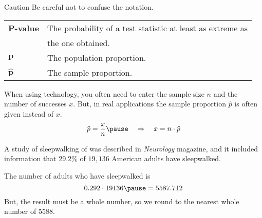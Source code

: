 \documentclass{beamer}
\begin{document}
\begin{frame}
\begin{block}{Caution}
Be careful not to confuse the notation.
\begin{center}
\begin{tabular}{ll}
\textbf{$\boldsymbol{P}$-value} & The probability of a test statistic at least as extreme as \\
&the one obtained.\\
$\boldsymbol{p}$ & The population proportion.\\
$\boldsymbol{\hat{p}}$ & The sample proportion.
\end{tabular}
\end{center}
\end{block}
\end{frame}

\begin{frame}
\begin{note}
When using technology, you often need to enter the sample size $n$ and the number of successes $x$. But, in real applications the sample proportion $\hat{p}$ is often given instead of $x$.\pause
\begin{equation*}
\hat{p} = \dfrac{x}{n} \pause
\quad\Rightarrow\quad
x = n\cdot\hat{p}
\end{equation*}
\end{note}\pause

\begin{example}
A study of sleepwalking of  was described in \emph{Neurology} magazine, and it included information that 29.2\% of $19,136$ American adults have sleepwalked.\pause

\vspace{1mm}
The number of adults who have sleepwalked is
\begin{equation*}
0.292\cdot 19136\pause=5587.712
\end{equation*}\pause
But, the result must be a whole number, so we round to the nearest whole number of 5588.
\end{example}
\end{frame}
\end{document}
